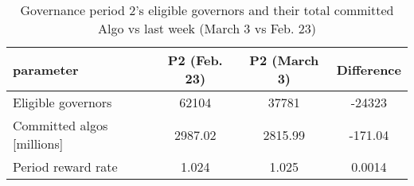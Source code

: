%
\begin{longtable}[c]{ l c c c }
\caption{Governance period 2's eligible governors and their total committed Algo vs last week (March 3 vs Feb. 23)} \\
\hline
\textbf{parameter} & \textbf{P2 (Feb. 23)} & \textbf{P2 (March 3)} & \textbf{Difference} \\
\hline

Eligible governors & 62104 & 37781 & -24323 \\
Committed algos [millions] & 2987.02 & 2815.99 & -171.04 \\
Period reward rate & 1.024 & 1.025 & 0.0014 \\
\hline
\end{longtable} 
